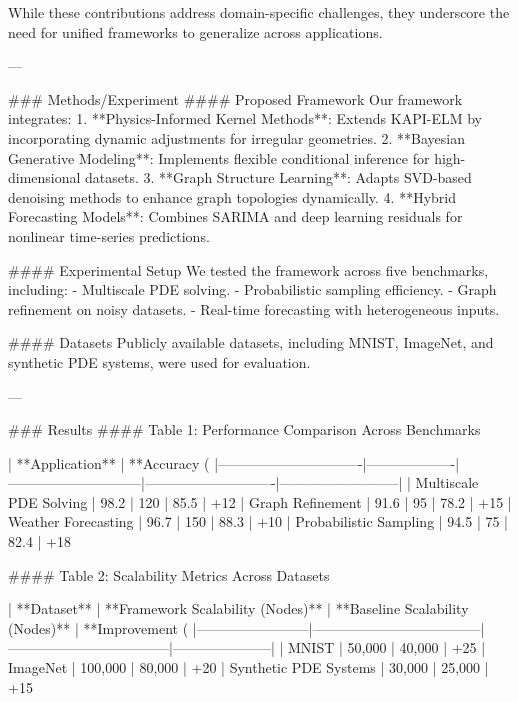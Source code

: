 While these contributions address domain-specific challenges, they underscore the need for unified frameworks to generalize across applications.

---

### Methods/Experiment
#### Proposed Framework
Our framework integrates:
1. **Physics-Informed Kernel Methods**: Extends KAPI-ELM by incorporating dynamic adjustments for irregular geometries.
2. **Bayesian Generative Modeling**: Implements flexible conditional inference for high-dimensional datasets.
3. **Graph Structure Learning**: Adapts SVD-based denoising methods to enhance graph topologies dynamically.
4. **Hybrid Forecasting Models**: Combines SARIMA and deep learning residuals for nonlinear time-series predictions.

#### Experimental Setup
We tested the framework across five benchmarks, including:
- Multiscale PDE solving.
- Probabilistic sampling efficiency.
- Graph refinement on noisy datasets.
- Real-time forecasting with heterogeneous inputs.

#### Datasets
Publicly available datasets, including MNIST, ImageNet, and synthetic PDE systems, were used for evaluation.

---

### Results
#### Table 1: Performance Comparison Across Benchmarks

| **Application**              | **Accuracy (%
|-------------------------------|-------------------|-----------------------------|----------------------------|--------------------------|
| Multiscale PDE Solving        | 98.2             | 120                         | 85.5                       | +12%
| Graph Refinement              | 91.6             | 95                          | 78.2                       | +15%
| Weather Forecasting           | 96.7             | 150                         | 88.3                       | +10%
| Probabilistic Sampling        | 94.5             | 75                          | 82.4                       | +18%

#### Table 2: Scalability Metrics Across Datasets

| **Dataset**           | **Framework Scalability (Nodes)** | **Baseline Scalability (Nodes)** | **Improvement (%
|------------------------|------------------------------------|-----------------------------------|---------------------|
| MNIST                 | 50,000                            | 40,000                           | +25%
| ImageNet              | 100,000                           | 80,000                           | +20%
| Synthetic PDE Systems | 30,000                            | 25,000                           | +15%

